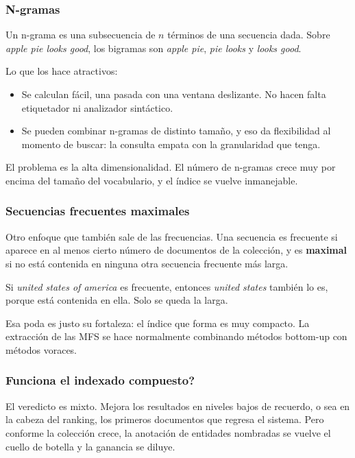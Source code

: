 \documentclass[11pt,letterpaper]{article}
\begin{document}
\subsubsection*{N-gramas}

Un n-grama es una subsecuencia de $n$ términos de una secuencia dada.
Sobre \textit{apple pie looks good}, los bigramas son
\textit{apple pie}, \textit{pie looks} y \textit{looks good}.

Lo que los hace atractivos:

\begin{itemize}[itemsep=0.2em]
    \item Se calculan fácil, una pasada con una ventana deslizante.
          No hacen falta etiquetador ni analizador sintáctico.
    \item Se pueden combinar n-gramas de distinto tamaño, y eso da
          flexibilidad al momento de buscar: la consulta empata con la
          granularidad que tenga.
\end{itemize}

El problema es la alta dimensionalidad. El número de n-gramas crece
muy por encima del tamaño del vocabulario, y el índice se vuelve
inmanejable.


\subsubsection*{Secuencias frecuentes maximales}

Otro enfoque que también sale de las frecuencias. Una secuencia es
frecuente si aparece en al menos cierto número de documentos de la
colección, y es \textbf{maximal} si no está contenida en ninguna otra
secuencia frecuente más larga.

\begin{ejemplo}
    Si \textit{united states of america} es frecuente, entonces
    \textit{united states} también lo es, porque está contenida en
    ella. Solo se queda la larga.
\end{ejemplo}

Esa poda es justo su fortaleza: el índice que forma es muy compacto.
La extracción de las MFS se hace normalmente combinando métodos
bottom-up con métodos voraces.

\subsubsection*{Funciona el indexado compuesto?}

El veredicto es mixto. Mejora los resultados en niveles bajos de
recuerdo, o sea en la cabeza del ranking, los primeros documentos que
regresa el sistema. Pero conforme la colección crece, la anotación de
entidades nombradas se vuelve el cuello de botella y la ganancia se
diluye.
\end{document}
